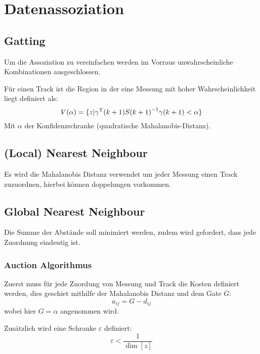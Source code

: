 \chapter{Datenassoziation}
\section{Gatting}
Um die Assoziation zu vereinfachen werden im Vorraus unwahrscheinliche Kombinationen ausgeschlossen. 

Für einen Track ist die Region in der eine Messung mit hoher Wahrscheinlichkeit liegt definiert als:
\begin{equation*}
    V(\alpha) = \{z | \gamma^\text{T}(k+1){S(k+1)}^{-1} \gamma(k+1) < \alpha\}
\end{equation*}
Mit $\alpha$ der Konfidenzschranke (quadratische Mahalanobis-Distanz).

\section{(Local) Nearest Neighbour}
Es wird die Mahalanobis Distanz verwendet um jeder Messung einen Track zuzuordnen, hierbei können doppelungen vorkommen.

\section{Global Nearest Neighbour}
Die Summe der Abstände soll minimiert werden, zudem wird gefordert, dass jede Zuordnung eindeutig ist.

\subsection{Auction Algorithmus}
Zuerst muss für jede Zuordung von Messung und Track die Kosten definiert werden, dies geschiet mithilfe der Mahalanobis Distanz und dem Gate $G$:
\begin{equation*}
    a_{ij} = G - d_{ij}
\end{equation*}
wobei hier $G = \alpha$ angenommen wird.

Zusätzlich wird eine Schranke $\varepsilon$ definiert:
\begin{equation*}
    \varepsilon < \frac{1}{\dim[z]}
\end{equation*}

